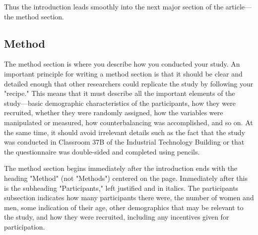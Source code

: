 Thus the introduction leads smoothly into the next major section of the article---the method section.

\subsection{Method}

The method section is where you describe how you conducted your study. An important principle for writing a method section is that it should be clear and detailed enough that other researchers could replicate the study by following your "recipe." This means that it must describe all the important elements of the study---basic demographic characteristics of the participants, how they were recruited, whether they were randomly assigned, how the variables were manipulated or measured, how counterbalancing was accomplished, and so on. At the same time, it should avoid irrelevant details such as the fact that the study was conducted in Classroom 37B of the Industrial Technology Building or that the questionnaire was double-sided and completed using pencils.

The method section begins immediately after the introduction ends with the heading "Method" (not "Methods") centered on the page. Immediately after this is the subheading "Participants," left justified and in italics. The participants subsection indicates how many participants there were, the number of women and men, some indication of their age, other demographics that may be relevant to the study, and how they were recruited, including any incentives given for participation.


